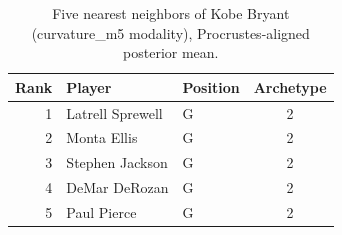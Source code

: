 \begin{table}[htbp]
  \centering\small
  \begin{tabular}{rllc}
    \toprule
    Rank & Player & Position & Archetype \\
    \midrule
    1 & Latrell Sprewell & G & 2 \\
    2 & Monta Ellis & G & 2 \\
    3 & Stephen Jackson & G & 2 \\
    4 & DeMar DeRozan & G & 2 \\
    5 & Paul Pierce & G & 2 \\
    \bottomrule
  \end{tabular}
  \caption{Five nearest neighbors of Kobe Bryant (curvature_m5 modality), Procrustes-aligned posterior mean.}
  \label{tab:Kobe_Bryant_neighbors_curvature_m5}
\end{table}

